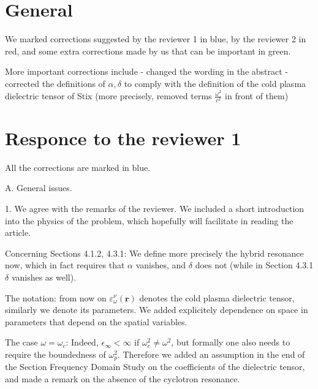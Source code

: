 \documentclass[a4paper,10pt]{article}
\title{}
\author{}
\begin{document}
\maketitle

\begin{abstract}

\end{abstract}

\section{General}

We marked corrections suggested by the reviewer 1 in blue, by the reviewer 2 in red, 
and some extra corrections made by us that can be important in green.

More important corrections include
- changed the wording in the abstract
- corrected the definitions of $\alpha,\delta$ to comply with the definition of the cold plasma dielectric tensor of Stix 
(more precisely, removed terms $\frac{\omega^2}{c^2}$ in 
front of them)




\section{Responce to the reviewer 1}

All the corrections are marked in blue. 

A. General issues.

1. We agree with the remarks of the reviewer. We included a short introduction into the physics of the problem, 
which hopefully will facilitate in reading the article. 

Concerning Sections 4.1.2, 4.3.1: 
We define more precisely the hybrid resonance now, which in fact requires that $\alpha$ vanishes, 
and $\delta$ does not (while in Section 4.3.1 $\delta$ vanishes as well).


The notation: 
from now on $\varepsilon^{\nu}_{\omega}(\mathbf{r})$ denotes the cold plasma dielectric tensor, similarly we denote its parameters. 
We added explicitely dependence on space in parameters that depend on the spatial variables. 

The case $\omega=\omega_c$:
Indeed, $\epsilon_{\infty}<\infty$ if $\omega_c^2\neq \omega^2$, but formally one also needs to require the boundedness of $\omega_p^2$. Therefore we 
added an assumption in the end of the Section Frequency Domain Study on the coefficients of the dielectric tensor, and made a remark on the absence
of the cyclotron resonance. 
\end{document}
